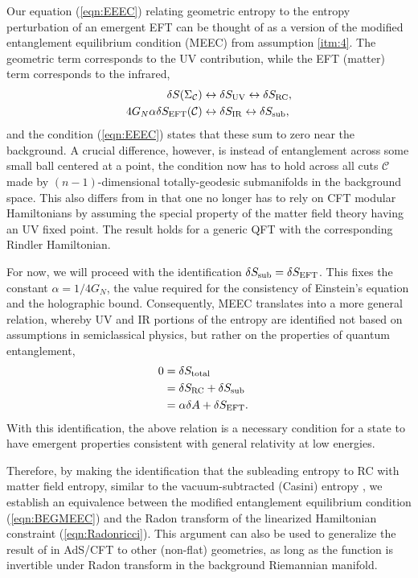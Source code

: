 \documentclass[%
preprint,
nofootinbib,
amsmath,amssymb,
aps,
prd,
showpacs,
superscriptaddress
]{revtex4-1}
\newcommand{\region}{\Sigma}
\begin{document}
Our equation (\ref{eqn:EEEC}) relating geometric entropy to the entropy perturbation of an emergent EFT can be thought of as a version of the modified entanglement equilibrium condition (MEEC) from assumption \ref{itm:4}. 
The geometric term corresponds to the UV contribution, while the EFT (matter) term corresponds to the infrared,
\begin{align}
\delta S({\region}_{\mathcal{C}})&\leftrightarrow \delta S_{\mathrm{UV}} \leftrightarrow \delta S_{\mathrm{RC}}, \\
 4G_N\alpha\delta S_{\rm EFT}(\mathcal{C})& \leftrightarrow\delta S_{\mathrm{IR}} \leftrightarrow \delta S_{\rm sub},
\end{align}
and the condition (\ref{eqn:EEEC}) states that these sum to zero near the background. A crucial difference, however, is instead of entanglement across some small ball centered at a point, the condition now has to hold across all cuts $\mathcal{C}$ made by $(n-1)$-dimensional totally-geodesic submanifolds in the background space. This also differs from  \cite{Jacobson:2015hqa} in that one no longer has to rely on CFT modular Hamiltonians by assuming the special property of the matter field theory having an UV fixed point. The result holds for a generic QFT with the corresponding Rindler Hamiltonian. 

For now, we will proceed with the identification $\delta S_{\rm sub} = \delta S_{\rm EFT}$.  
This fixes the constant $\alpha = 1/4G_N$, the value required for the consistency of Einstein's equation and the holographic bound. 
Consequently, MEEC translates into a more general relation, whereby UV and IR portions of the entropy are identified not based on assumptions in semiclassical physics, but rather on the properties of quantum entanglement,
\begin{align}
0&=\delta S_{\rm total}\cr &=\delta S_{\rm RC}+ \delta S_{\rm sub} \cr & =\alpha\delta A +\delta S_{\rm EFT}.
\label{eqn:BEGMEEC}
\end{align}
With this identification, the above relation is a necessary condition for a state to have emergent properties consistent with general relativity at low energies. 

Therefore, by making the identification that the subleading entropy to RC with matter field entropy, similar to the vacuum-subtracted (Casini) entropy  \cite{Casini:2008cr,Bousso:2014sda,Bousso:2014uxa}, we establish an equivalence between the modified entanglement equilibrium condition (\ref{eqn:BEGMEEC}) and the Radon transform of the linearized Hamiltonian constraint (\ref{eqn:Radonricci}). This argument can also be used to generalize the result of  \cite{Faulkner:2013ica} in AdS/CFT to other (non-flat) geometries, as long as the function is invertible under Radon transform in the background Riemannian manifold.
\end{document}
